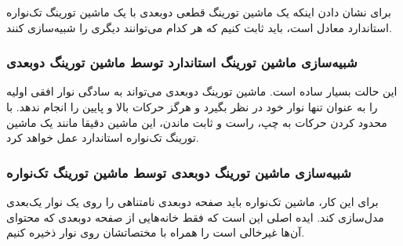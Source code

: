 برای نشان دادن اینکه یک ماشین تورینگ قطعی دوبعدی با یک ماشین تورینگ تک‌نواره استاندارد معادل است، باید ثابت کنیم که هر کدام می‌توانند دیگری را شبیه‌سازی کنند.

\subsubsection*{شبیه‌سازی ماشین تورینگ استاندارد توسط ماشین تورینگ دوبعدی}
این حالت بسیار ساده است. ماشین تورینگ دوبعدی می‌تواند به سادگی نوار افقی اولیه را به عنوان تنها نوار خود در نظر بگیرد و هرگز حرکات بالا و پایین را انجام ندهد. با محدود کردن حرکات به چپ، راست و ثابت ماندن، این ماشین دقیقا مانند یک ماشین تورینگ تک‌نواره استاندارد عمل خواهد کرد.

\subsubsection*{شبیه‌سازی ماشین تورینگ دوبعدی توسط ماشین تورینگ تک‌نواره}
برای این کار، ماشین تک‌نواره باید صفحه دوبعدی نامتناهی را روی یک نوار یک‌بعدی مدل‌سازی کند. ایده اصلی این است که فقط خانه‌هایی از صفحه دوبعدی که محتوای آن‌ها غیرخالی است را همراه با مختصاتشان روی نوار ذخیره کنیم.

